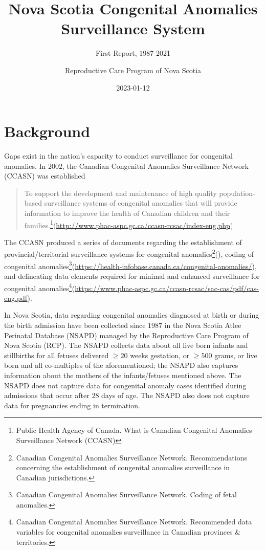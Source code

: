 \documentclass[
]{krantz}
\title{Nova Scotia Congenital Anomalies Surveillance System}
\subtitle{First Report, 1987-2021}
\author{Reproductive Care Program of Nova Scotia}
\date{2023-01-12}
\begin{document}
\pagestyle{empty}

\setcounter{page}{1}
\maketitle
\thispagestyle{empty}
\newpage


{
\hypersetup{linkcolor=}
\setcounter{tocdepth}{3}
\tableofcontents
\newpage
}


\hypertarget{background}{%
\chapter*{Background}\label{background}}


Gaps exist in the nation's capacity to conduct surveillance for congenital anomalies. In \(2002\), the Canadian Congenital Anomalies Surveillance Network (CCASN) was established

\begin{quote}
To support the development and maintenance of high quality population-based surveillance systems of congenital anomalies that will provide information to improve the health of Canadian children and their families.\footnote{Public Health Agency of Canada. What is Canadian Congenital Anomalies Surveillance Network (CCASN)}(\url{http://www.phac-aspc.gc.ca/ccasn-rcsac/index-eng.php})
\end{quote}

The CCASN produced a series of documents regarding the establishment of provincial/territorial surveillance systems for congenital anomalies\footnote{Canadian Congenital Anomalies Surveillance Network. Recommendations concerning the establishment of congenital anomalies surveillance in Canadian jurisdictions.}(), coding of congenital anomalies\footnote{Canadian Congenital Anomalies Surveillance Network. Coding of fetal anomalies.}(\url{https://health-infobase.canada.ca/congenital-anomalies/}), and delineating data elements required for minimal and enhanced surveillance for congenital anomalies\footnote{Canadian Congenital Anomalies Surveillance Network. Recommended data variables for congenital anomalies surveillance in Canadian provinces \& territories.}(\url{https://www.phac-aspc.gc.ca/ccasn-rcsac/sac-cas/pdf/cas-eng.pdf}).

In Nova Scotia, data regarding congenital anomalies diagnosed at birth or during the birth admission have been collected since \(1987\) in the Nova Scotia Atlee Perinatal Database (NSAPD) managed by the Reproductive Care Program of Nova Scotia (RCP). The NSAPD collects data about all live born infants and stillbirths for all fetuses delivered \(\ge 20\) weeks gestation, or \(\ge 500\) grams, or live born and all co-multiples of the aforementioned; the NSAPD also captures information about the mothers of the infants/fetuses mentioned above. The NSAPD does not capture data for congenital anomaly cases identified during admissions that occur after \(28\) days of age. The NSAPD also does not capture data for pregnancies ending in termination.
\end{document}
